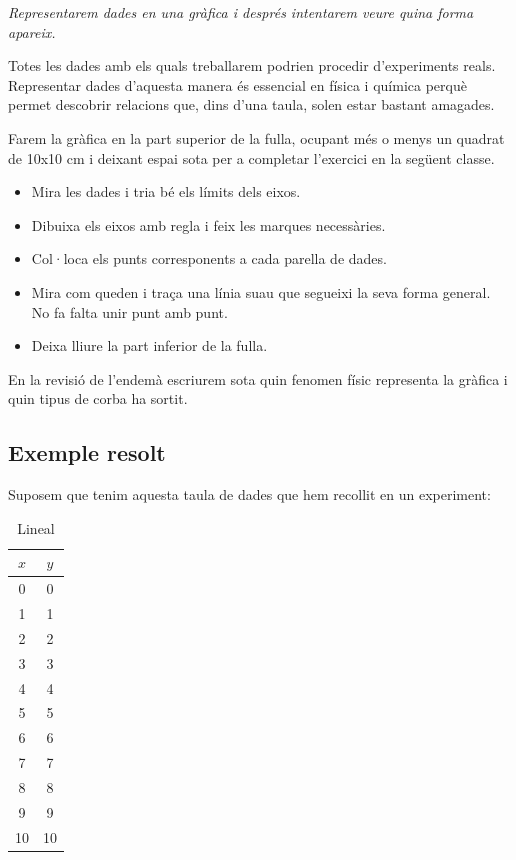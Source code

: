 
\textit{Representarem dades en una gràfica i després intentarem veure quina forma apareix.}

Totes les dades amb els quals treballarem podrien procedir d'experiments reals. Representar dades d'aquesta manera és essencial en física i química perquè permet descobrir relacions que, dins d'una taula, solen estar bastant amagades.

Farem la gràfica en la part superior de la fulla, ocupant més o menys un quadrat de 10x10 cm i deixant espai sota per a completar l'exercici en la següent classe.
\begin{itemize}
    \item Mira les dades i tria bé els límits dels eixos.
    \item Dibuixa els eixos amb regla i feix les marques necessàries.
    \item Col·loca els punts corresponents a cada parella de dades.
    \item Mira com queden i traça una línia suau que segueixi la seva forma general. No fa falta unir punt amb punt.
    \item Deixa lliure la part inferior de la fulla.
\end{itemize}

En la revisió de l'endemà escriurem sota quin fenomen físic representa la gràfica i quin tipus de corba ha sortit.

\subsection{Exemple resolt}
Suposem que tenim aquesta taula de dades que hem recollit en un experiment:
\begin{table}[h]
\centering
\begin{tabular}{c|c}
$x$ & $y$ \\
\hline
0 & 0 \\
1 & 1 \\
2 & 2 \\
3 & 3 \\
4 & 4 \\
5 & 5 \\
6 & 6 \\
7 & 7 \\
8 & 8 \\
9 & 9 \\
10 & 10 \\
\end{tabular}
\caption{Lineal}
\end{table}

